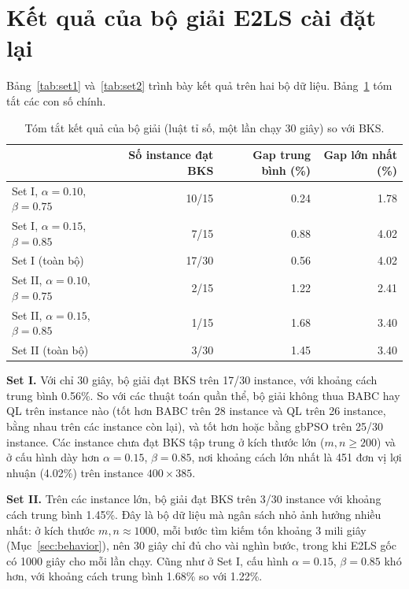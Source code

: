\section{Kết quả của bộ giải E2LS cài đặt lại}\label{sec:lit_results}

Bảng~\ref{tab:set1} và~\ref{tab:set2} trình bày kết quả trên hai bộ dữ liệu. Bảng~\ref{tab:lit_summary} tóm tắt các con số chính.





\begin{table}[H]
\centering
\caption{Tóm tắt kết quả của bộ giải (luật tỉ số, một lần chạy 30 giây) so với BKS.}
\label{tab:lit_summary}
\small
\begin{tabular}{lrrr}
\toprule
 & \textbf{Số instance đạt BKS} & \textbf{Gap trung bình (\%)} & \textbf{Gap lớn nhất (\%)}\\
\midrule
Set I, $\alpha=0.10$, $\beta=0.75$ & 10/15 & 0.24 & 1.78 \\
Set I, $\alpha=0.15$, $\beta=0.85$ & 7/15 & 0.88 & 4.02 \\
Set I (toàn bộ) & 17/30 & 0.56 & 4.02 \\
\midrule
Set II, $\alpha=0.10$, $\beta=0.75$ & 2/15 & 1.22 & 2.41 \\
Set II, $\alpha=0.15$, $\beta=0.85$ & 1/15 & 1.68 & 3.40 \\
Set II (toàn bộ) & 3/30 & 1.45 & 3.40 \\
\bottomrule
\end{tabular}
\end{table}

\textbf{Set I.} Với chỉ 30 giây, bộ giải đạt BKS trên 17/30 instance, với khoảng cách trung bình 0.56\%. So với các thuật toán quần thể, bộ giải không thua BABC hay QL trên instance nào (tốt hơn BABC trên 28 instance và QL trên 26 instance, bằng nhau trên các instance còn lại), và tốt hơn hoặc bằng gbPSO trên 25/30 instance. Các instance chưa đạt BKS tập trung ở kích thước lớn ($m,n\ge 200$) và ở cấu hình dày hơn $\alpha=0.15$, $\beta=0.85$, nơi khoảng cách lớn nhất là 451 đơn vị lợi nhuận (4.02\%) trên instance $400\times385$.

\textbf{Set II.} Trên các instance lớn, bộ giải đạt BKS trên 3/30 instance với khoảng cách trung bình 1.45\%. Đây là bộ dữ liệu mà ngân sách nhỏ ảnh hưởng nhiều nhất: ở kích thước $m,n\approx1000$, mỗi bước tìm kiếm tốn khoảng 3 mili giây (Mục~\ref{sec:behavior}), nên 30 giây chỉ đủ cho vài nghìn bước, trong khi E2LS gốc có 1000 giây cho mỗi lần chạy. Cũng như ở Set I, cấu hình $\alpha=0.15$, $\beta=0.85$ khó hơn, với khoảng cách trung bình 1.68\% so với 1.22\%.


